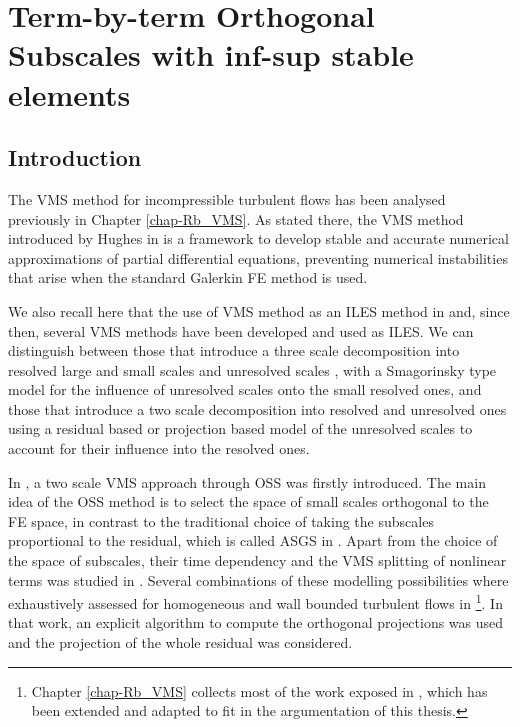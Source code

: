 \chapter{Term-by-term Orthogonal Subscales with inf-sup stable elements}
\label{chap-TBT_OSS}

\section{Introduction}
\label{sec-C5_intro}

The VMS method for incompressible turbulent flows has been analysed previously in Chapter \ref{chap-Rb_VMS}. As stated there, the VMS method introduced by Hughes in \cite{hughes_multiscale_1995,hughes_variational_1998} is a framework to develop stable and accurate numerical approximations of partial differential equations, preventing numerical instabilities that arise when the standard Galerkin FE method is used. 

We also recall here that the use of VMS method as an ILES method in \cite{hughes_multiscale_2001,hughes_large_2001,codina_stabilized_2002} and, since then, several VMS methods have been developed and used as ILES. We can distinguish between those that introduce a three scale decomposition into resolved large and small scales and unresolved scales \cite{koobus_variational_2004,john_variants_2008, john_numerical_2010, masud_variational_2011}, with a Smagorinsky type model for the influence of unresolved scales onto the small resolved ones, and those that introduce a two scale decomposition into resolved and unresolved ones \cite{bazilevs_variational_2007,colomes_assessment_2015} using a residual based or projection based model of the unresolved scales to account for their influence into the resolved ones.

In \cite{codina_stabilization_2000}, a two scale VMS approach through OSS was firstly introduced. The main idea of the OSS method is to select the space of small scales orthogonal to the FE space, in contrast to the traditional choice of taking the subscales proportional to the residual, which is called ASGS in \cite{codina_stabilization_2000}. Apart from the choice of the space of subscales, their time dependency and the VMS splitting of nonlinear terms was studied in \cite{codina_time_2007}. Several combinations of these modelling possibilities where exhaustively assessed for homogeneous and wall bounded turbulent flows in \cite{colomes_assessment_2015}\footnote{Chapter \ref{chap-Rb_VMS} collects most of the work exposed in \cite{colomes_assessment_2015}, which has been extended and adapted to fit in the argumentation of this thesis.}. In that work, an explicit algorithm to compute the orthogonal projections was used and the projection of the whole residual was considered.

